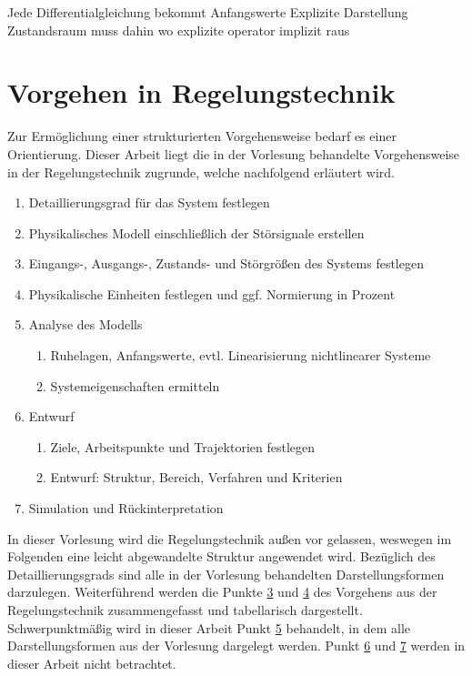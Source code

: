 Jede Differentialgleichung bekommt Anfangswerte
Explizite Darstellung Zustandsraum muss dahin wo explizite operator
implizit raus

\section{Vorgehen in Regelungstechnik}
Zur Ermöglichung einer strukturierten Vorgehensweise bedarf es einer Orientierung. Dieser Arbeit liegt die in der Vorlesung behandelte Vorgehensweise in der Regelungstechnik zugrunde, welche nachfolgend erläutert wird.

\begin{enumerate}
    \item Detaillierungsgrad für das System festlegen
    \item Physikalisches Modell einschließlich der Störsignale erstellen
    \item Eingangs-, Ausgangs-, Zustands- und Störgrößen des Systems festlegen
    \label{Punkt3}
    \item Physikalische Einheiten festlegen und ggf. Normierung in Prozent
    \label{Punkt4}
    \item Analyse des Modells
    \label{Punkt5}
    \begin{enumerate}
        \item Ruhelagen, Anfangswerte, evtl. Linearisierung nichtlinearer Systeme
        \item Systemeigenschaften ermitteln
    \end{enumerate}
    \item Entwurf
    \label{Punkt6}
    \begin{enumerate}
        \item Ziele, Arbeitspunkte und Trajektorien festlegen
        \item Entwurf: Struktur, Bereich, Verfahren und Kriterien
    \end{enumerate}
    \item Simulation und Rückinterpretation
    \label{Punkt7}
\end{enumerate}

In dieser Vorlesung wird die Regelungstechnik außen vor gelassen, weswegen im Folgenden eine leicht abgewandelte Struktur angewendet wird. Bezüglich des Detaillierungsgrads sind alle in der Vorlesung behandelten Darstellungsformen darzulegen. Weiterführend werden die Punkte \hyperref[Punkt3]{3} und \hyperref[Punkt4]{4} des Vorgehens aus der Regelungstechnik zusammengefasst und tabellarisch dargestellt. Schwerpunktmäßig wird in dieser Arbeit Punkt \hyperref[Punkt5]{5} behandelt, in dem alle Darstellungsformen aus der Vorlesung dargelegt werden. Punkt \hyperref[Punkt6]{6} und \hyperref[Punkt7]{7} werden in dieser Arbeit nicht betrachtet.

